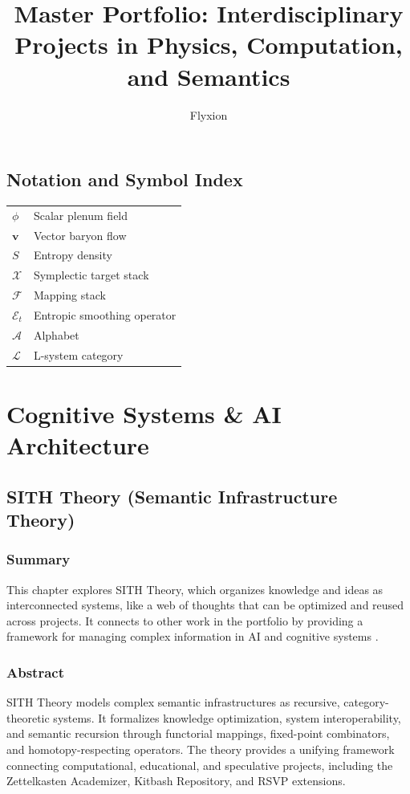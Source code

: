 \documentclass[11pt,oneside]{memoir}
\theoremstyle{plain}
\newcommand{\F}{\mathcal{F}}
\newcommand{\X}{\mathcal{X}}
\newcommand{\E}{\mathcal{E}}
\newcommand{\A}{\mathcal{A}}
\newcommand{\Lcal}{\mathcal{L}} %
\begin{document}
\cleardoublepage %
\frontmatter
\pagestyle{empty} %
\title{Master Portfolio: Interdisciplinary Projects in Physics, Computation, and Semantics}
\author{Flyxion}
\maketitle
\thispagestyle{empty} %
\tableofcontents
\listoffigures

\chapter*{Notation and Symbol Index}
\begin{tabular}{ll}
$\phi$ & Scalar plenum field \\
$\mathbf{v}$ & Vector baryon flow \\
$S$ & Entropy density \\
$\X$ & Symplectic target stack \\
$\F$ & Mapping stack \\
$\E_t$ & Entropic smoothing operator \\
$\A$ & Alphabet \\
$\Lcal$ & L-system category \\
\end{tabular}

\mainmatter
\pagestyle{headings} %

\part{Cognitive Systems \& AI Architecture}

\chapter{SITH Theory (Semantic Infrastructure Theory)}
\label{sec:sith}

\section{Summary}
This chapter explores SITH Theory, which organizes knowledge and ideas as interconnected systems, like a web of thoughts that can be optimized and reused across projects. It connects to other work in the portfolio by providing a framework for managing complex information in AI and cognitive systems \cite{maclane}.

\section{Abstract}
SITH Theory models complex semantic infrastructures as recursive, category-theoretic systems. It formalizes knowledge optimization, system interoperability, and semantic recursion through functorial mappings, fixed-point combinators, and homotopy-respecting operators. The theory provides a unifying framework connecting computational, educational, and speculative projects, including the Zettelkasten Academizer, Kitbash Repository, and RSVP extensions.
\end{document}
